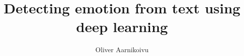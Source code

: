 \documentclass{thesis}
\begin{document}

\title{\huge{Detecting emotion from text using deep learning}}
\author{Oliver Aarnikoivu}

% 

% 
% 

% 
% 
% 
% 

\footnotesize


\normalsize
\appendix
% 
\end{document}
